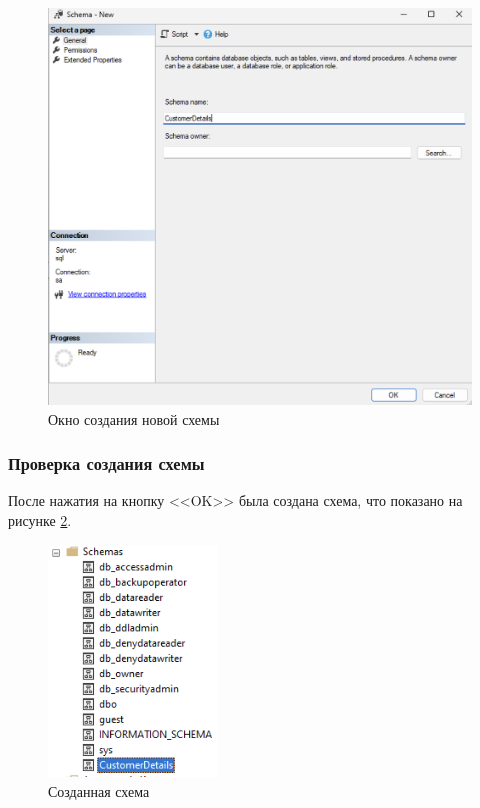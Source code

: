 \documentclass[a4paper, 14pt]{extarticle}
\begin{document}
\begin{figure}[H]
  \centering
  \includegraphics[width=\textwidth]{images/task-5/step-3.png}
  \caption{Окно создания новой схемы}
  \label{fig:task-5/step-3.png}
\end{figure}

\subsubsection{Проверка создания схемы}

После нажатия на кнопку <<OK>> была создана схема, что показано на рисунке
\ref{fig:task-5/step-4.png}.

\begin{figure}[H]
  \centering
  \includegraphics[width=0.4\textwidth]{images/task-5/step-4.png}
  \caption{Созданная схема}
  \label{fig:task-5/step-4.png}
\end{figure}
\end{document}
